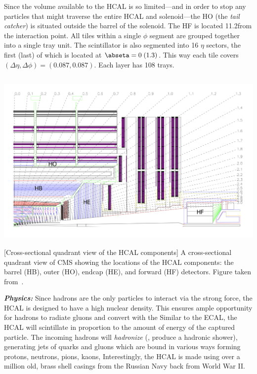 Since the volume available to the HCAL is so limited---and in order to stop any particles that might traverse the entire HCAL and solenoid---the HO (the \emph{tail catcher}) is situated outside the barrel of the solenoid.
The HF is located 11.2\meter from the interaction point.
All tiles within a single $\phi$ segment are grouped together into a single tray unit.
The scintillator is also segmented into 16 $\eta$ sectors, the first (last) of which is located at $\abseta = 0\;(1.3)$.
This way each tile covers $(\Delta \eta, \Delta \phi) = (0.087, 0.087)$.
Each layer has 108 trays.
\begin{multiFigure}
    \centering
        \includegraphics[height=9cm]{figures/cms/hcal/hcal_quadrants_longitudinalview.jpg}
        [Cross-sectional quadrant view of the HCAL components]
        {A cross-sectional quadrant view of CMS showing the locations of the HCAL components:
        the barrel (HB), outer (HO), endcap (HE), and forward (HF) detectors.
        Figure taken from~\cite{collaboration_cms_2008}.}
    \label{fig:hcal_quadrant}
\end{multiFigure}

\textit{\textbf{Physics:}}
Since hadrons are the only particles to interact via the strong force, the HCAL is designed to have a high nuclear density.
This ensures ample opportunity for hadrons to radiate gluons and convert  with the Similar to the ECAL, the HCAL will scintillate in proportion to the amount of energy of the captured particle. 
The incoming hadrons will \emph{hadronize} (\ie, produce a hadronic shower), generating jets of quarks and gluons which are bound in various ways forming protons, neutrons, pions, kaons, \etc
Interestingly, the HCAL is made using over a million old, brass shell casings from the Russian Navy back from World War II.

